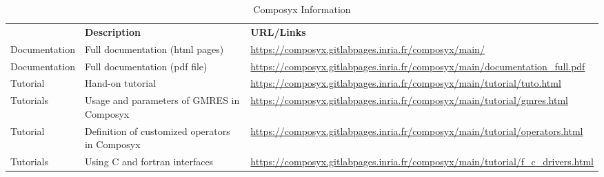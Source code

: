 \begin{table}[H]
{{%
    {
    \setlength{\parindent}{0pt}
    \def\arraystretch{1.25}
    {\fontsize{9}{11}\selectfont
    \begin{tabular}{!{\color{numpexgray}\vrule}p{0.20\textwidth}
                    !{\color{numpexgray}\vrule}p{0.40\textwidth}
                    !{\color{numpexgray}\vrule}p{0.35\textwidth}
                    !{\color{numpexgray}\vrule}}
         & {\rule{0pt}{2.5ex}\color{white}\bf Description} 
      & {\rule{0pt}{2.5ex}\color{white}\bf URL/Links} \\

      Documentation & Full documentation (html pages) & \url{https://composyx.gitlabpages.inria.fr/composyx/main/} \\

       Documentation & Full documentation (pdf file) & \url{https://composyx.gitlabpages.inria.fr/composyx/main/documentation_full.pdf} \\

       Tutorial & Hand-on tutorial & \url{https://composyx.gitlabpages.inria.fr/composyx/main/tutorial/tuto.html} \\

       Tutorials & Usage and parameters of GMRES in Composyx & \url{https://composyx.gitlabpages.inria.fr/composyx/main/tutorial/gmres.html} \\

       Tutorial & Definition of customized operators in Composyx & \url{https://composyx.gitlabpages.inria.fr/composyx/main/tutorial/operators.html} \\

       Tutorials & Using C and fortran interfaces & \url{https://composyx.gitlabpages.inria.fr/composyx/main/tutorial/f_c_drivers.html} \\

\bottomrule
    \end{tabular}
    }}

    }}
    \caption{Composyx Information}
\end{table}


